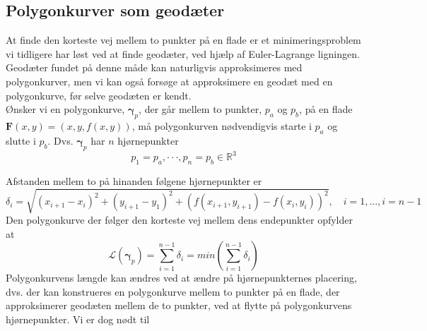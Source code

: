 \subsection{Polygonkurver som geodæter}
At finde den korteste vej mellem to punkter på en flade er et minimeringsproblem vi tidligere har løst ved at finde geodæter, ved hjælp af Euler-Lagrange ligningen. Geodæter fundet på denne måde kan naturligvis approksimeres med polygonkurver, men vi kan også forsøge at approksimere en geodæt med en polygonkurve, før selve geodæten er kendt. \\
Ønsker vi en polygonkurve, \(\pmb{\gamma}_p\), der går mellem to punkter, \(p_a\) og \(p_b\), på en flade \(\pmb{F}(x,y)=(x,y,f(x,y))\), må polygonkurven nødvendigvis starte i \(p_a\) og slutte i \(p_b\). Dvs. \(\pmb{\gamma}_p\) har \(n\) hjørnepunkter 
\begin{equation}
p_1=p_a, \cdot\cdot\cdot, p_n=p_b \in \mathbb{R}^3
\end{equation}

Afstanden mellem to på hinanden følgene hjørnepunkter er
\begin{equation}
\delta_i = \sqrt{\left(x_{i+1}-x_i\right)^2+\left(y_{i+1}-y_1\right)^2+\left(f\left(x_{i+1},y_{i+1}\right) - f\left(x_i,y_i\right)\right)^2}, \quad i=1,...,i=n-1
\end{equation}
Den polygonkurve der følger den korteste vej mellem dens endepunkter opfylder at
\begin{equation}
\mathscr{L}(\pmb{\gamma}_p)=\sum\limits_{i=1}^{n-1}\delta_i=min\left(\sum\limits_{i=1}^{n-1}\delta_i\right)
\end{equation}
Polygonkurvens længde kan ændres ved at ændre på hjørnepunkternes placering, dvs. der kan konstrueres en polygonkurve mellem to punkter på en flade, der approksimerer geodæten mellem de to punkter, ved at flytte på polygonkurvens hjørnepunkter. Vi er dog nødt til